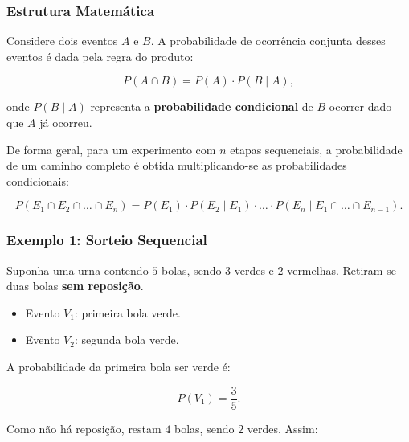 


\newpage
\subsubsection{Estrutura Matemática}

Considere dois eventos $A$ e $B$. A probabilidade de ocorrência conjunta desses
eventos é dada pela regra do produto:

\begin{equation}
P(A \cap B) = P(A)\cdot P(B \mid A),
\end{equation}

onde $P(B \mid A)$ representa a \textbf{probabilidade condicional} de $B$
ocorrer dado que $A$ já ocorreu.

De forma geral, para um experimento com $n$ etapas sequenciais, a probabilidade
de um caminho completo é obtida multiplicando-se as probabilidades condicionais:

\begin{equation}
P(E_1 \cap E_2 \cap \dots \cap E_n)
=
P(E_1)\cdot P(E_2\mid E_1)\cdot\dots\cdot P(E_n\mid E_1\cap\dots\cap E_{n-1}).
\end{equation}



\subsubsection{Exemplo 1: Sorteio Sequencial}

Suponha uma urna contendo $5$ bolas, sendo $3$ verdes e $2$ vermelhas.
Retiram-se duas bolas \textbf{sem reposição}.

\begin{itemize}
\item Evento $V_1$: primeira bola verde.
\item Evento $V_2$: segunda bola verde.
\end{itemize}

A probabilidade da primeira bola ser verde é:

\begin{equation}
P(V_1)=\frac{3}{5}.
\end{equation}

Como não há reposição, restam $4$ bolas, sendo $2$ verdes. Assim:

